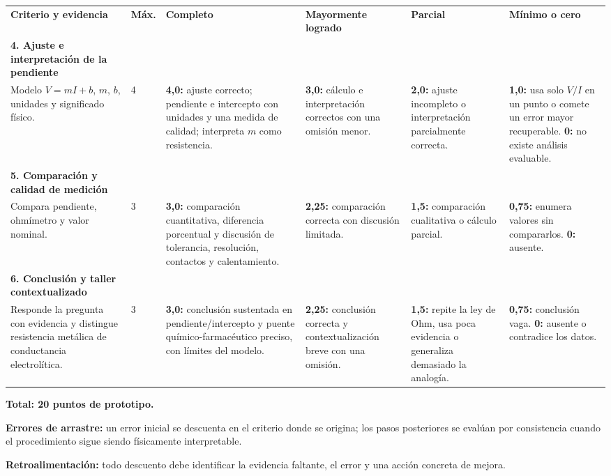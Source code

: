 \documentclass[10pt,letterpaper,landscape]{article}
\begin{document}
\newpage
\begin{longtable}{P{3.0cm}P{1.0cm}P{4.55cm}P{4.35cm}P{4.15cm}P{3.85cm}}
\color{white}\textbf{Criterio y evidencia} &
\color{white}\textbf{Máx.} &
\color{white}\textbf{Completo} &
\color{white}\textbf{Mayormente logrado} &
\color{white}\textbf{Parcial} &
\color{white}\textbf{Mínimo o cero}\\

\textbf{4. Ajuste e interpretación de la pendiente}\\
Modelo \(V=mI+b\), \(m\), \(b\), unidades y significado físico. &
4 &
\textbf{4,0:} ajuste correcto; pendiente e intercepto con unidades y una medida
de calidad; interpreta \(m\) como resistencia. &
\textbf{3,0:} cálculo e interpretación correctos con una omisión menor. &
\textbf{2,0:} ajuste incompleto o interpretación parcialmente correcta. &
\textbf{1,0:} usa solo \(V/I\) en un punto o comete un error mayor recuperable.
\textbf{0:} no existe análisis evaluable.\\

\textbf{5. Comparación y calidad de medición}\\
Compara pendiente, ohmímetro y valor nominal. &
3 &
\textbf{3,0:} comparación cuantitativa, diferencia porcentual y discusión de
tolerancia, resolución, contactos y calentamiento. &
\textbf{2,25:} comparación correcta con discusión limitada. &
\textbf{1,5:} comparación cualitativa o cálculo parcial. &
\textbf{0,75:} enumera valores sin compararlos. \textbf{0:} ausente.\\

\textbf{6. Conclusión y taller contextualizado}\\
Responde la pregunta con evidencia y distingue resistencia metálica de
conductancia electrolítica. &
3 &
\textbf{3,0:} conclusión sustentada en pendiente/intercepto y puente
químico-farmacéutico preciso, con límites del modelo. &
\textbf{2,25:} conclusión correcta y contextualización breve con una omisión. &
\textbf{1,5:} repite la ley de Ohm, usa poca evidencia o generaliza demasiado
la analogía. &
\textbf{0,75:} conclusión vaga. \textbf{0:} ausente o contradice los datos.\\
\end{longtable}

\textbf{Total: 20 puntos de prototipo.}

\textbf{Errores de arrastre:} un error inicial se descuenta en el criterio
donde se origina; los pasos posteriores se evalúan por consistencia cuando el
procedimiento sigue siendo físicamente interpretable.

\textbf{Retroalimentación:} todo descuento debe identificar la evidencia
faltante, el error y una acción concreta de mejora.
\end{document}
